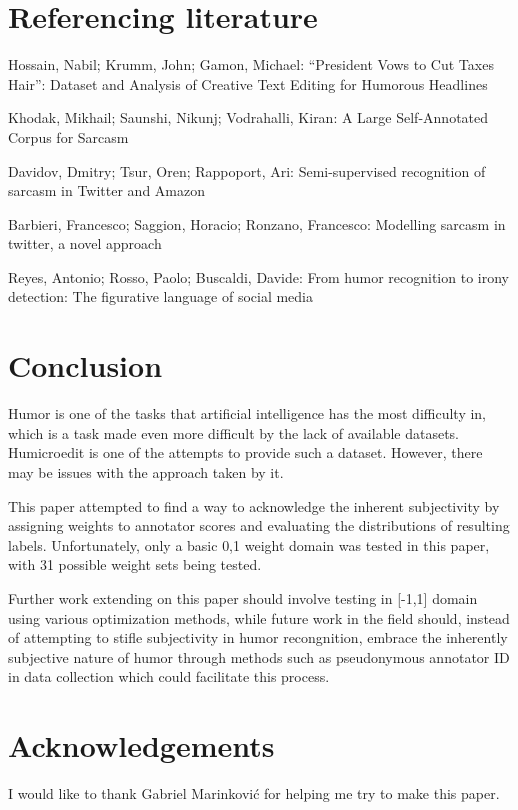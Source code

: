 \documentclass[10pt, a4paper]{article}
\begin{document}
\section{Referencing literature}

Hossain, Nabil; Krumm, John; Gamon, Michael: “President Vows to Cut Taxes Hair”: Dataset and Analysis of Creative Text Editing for Humorous Headlines

Khodak, Mikhail; Saunshi, Nikunj; Vodrahalli, Kiran: A Large Self-Annotated Corpus for Sarcasm

Davidov, Dmitry; Tsur, Oren; Rappoport, Ari: Semi-supervised recognition of sarcasm in Twitter and Amazon

Barbieri, Francesco; Saggion, Horacio; Ronzano, Francesco: Modelling sarcasm in twitter, a novel approach

Reyes, Antonio; Rosso, Paolo; Buscaldi, Davide: From humor recognition to irony detection: The figurative language of social media

\section{Conclusion}

Humor is one of the tasks that artificial intelligence has the most difficulty in, which is a task made even more difficult by the lack of available datasets. Humicroedit is one of the attempts to provide such a dataset. However, there may be issues with the approach taken by it.

This paper attempted to find a way to acknowledge the inherent subjectivity by assigning weights to annotator scores and evaluating the distributions of resulting labels. Unfortunately, only a basic {0,1} weight domain was tested in this paper, with 31 possible weight sets being tested.

Further work extending on this paper should involve testing in [-1,1] domain using various optimization methods, while future work in the field should, instead of attempting to stifle subjectivity in humor recongnition, embrace the inherently subjective nature of humor through methods such as pseudonymous annotator ID in data collection which could facilitate this process.

\section*{Acknowledgements}

I would like to thank Gabriel Marinković for helping me try to make this paper.


 
\end{document}
